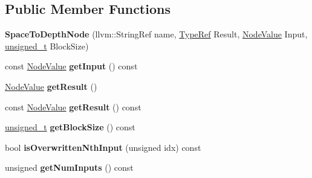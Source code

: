 \subsection*{Public Member Functions}
\begin{DoxyCompactItemize}
\item 
\mbox{\label{classglow_1_1_space_to_depth_node_aedc878f7ca4dba2092b66cc9fc305ae3}} 
{\bfseries Space\+To\+Depth\+Node} (llvm\+::\+String\+Ref name, \hyperlink{structglow_1_1_type}{Type\+Ref} Result, \hyperlink{structglow_1_1_node_value}{Node\+Value} Input, \hyperlink{namespaceglow_a0ca574644e1e42ef193a9947fb4d8911}{unsigned\+\_\+t} Block\+Size)
\item 
\mbox{\label{classglow_1_1_space_to_depth_node_a355774a558a3703106c90c676886ec93}} 
const \hyperlink{structglow_1_1_node_value}{Node\+Value} {\bfseries get\+Input} () const
\item 
\mbox{\label{classglow_1_1_space_to_depth_node_a172401145f1a8a5a206dda6958404e1f}} 
\hyperlink{structglow_1_1_node_value}{Node\+Value} {\bfseries get\+Result} ()
\item 
\mbox{\label{classglow_1_1_space_to_depth_node_abb7b332671d39d83feeeea9be03d10e5}} 
const \hyperlink{structglow_1_1_node_value}{Node\+Value} {\bfseries get\+Result} () const
\item 
\mbox{\label{classglow_1_1_space_to_depth_node_a1eb376ebc8582641094ab03f1776bef3}} 
\hyperlink{namespaceglow_a0ca574644e1e42ef193a9947fb4d8911}{unsigned\+\_\+t} {\bfseries get\+Block\+Size} () const
\item 
\mbox{\label{classglow_1_1_space_to_depth_node_ad7ac675703b3253a4dcd37686abbeb82}} 
bool {\bfseries is\+Overwritten\+Nth\+Input} (unsigned idx) const
\item 
\mbox{\label{classglow_1_1_space_to_depth_node_a1b2a63735723f6a19cdd62bfff35afd3}} 
unsigned {\bfseries get\+Num\+Inputs} () const
\item 
\mbox{\label{classglow_1_1_space_to_depth_node_a2e0cb9edebb861d27ba960104ce72ca3}} 

\end{DoxyCompactItemize}
